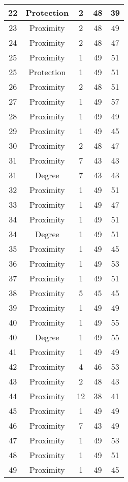 \documentclass[results.tex]{subfiles}
\begin{document}
\begin{center}
\begin{tabular}{| c || c | c | c | c |}
    \hline
    22 & Protection & 2 & 48 & 39 \\ 
    \hline
    23 & Proximity & 2 & 48 & 49 \\ 
    \hline
    24 & Proximity & 2 & 48 & 47 \\ 
    \hline
    25 & Proximity & 1 & 49 & 51 \\ 
    \hline
    25 & Protection & 1 & 49 & 51 \\ 
    \hline
    26 & Proximity & 2 & 48 & 51 \\ 
    \hline
    27 & Proximity & 1 & 49 & 57 \\ 
    \hline
    28 & Proximity & 1 & 49 & 49 \\ 
    \hline
    29 & Proximity & 1 & 49 & 45 \\ 
    \hline
    30 & Proximity & 2 & 48 & 47 \\ 
    \hline
    31 & Proximity & 7 & 43 & 43 \\ 
    \hline
    31 & Degree & 7 & 43 & 43 \\ 
    \hline
    32 & Proximity & 1 & 49 & 51 \\ 
    \hline
    33 & Proximity & 1 & 49 & 47 \\ 
    \hline
    34 & Proximity & 1 & 49 & 51 \\ 
    \hline
    34 & Degree & 1 & 49 & 51 \\ 
    \hline
    35 & Proximity & 1 & 49 & 45 \\ 
    \hline
    36 & Proximity & 1 & 49 & 53 \\ 
    \hline
    37 & Proximity & 1 & 49 & 51 \\ 
    \hline
    38 & Proximity & 5 & 45 & 45 \\ 
    \hline
    39 & Proximity & 1 & 49 & 49 \\ 
    \hline
    40 & Proximity & 1 & 49 & 55 \\ 
    \hline
    40 & Degree & 1 & 49 & 55 \\ 
    \hline
    41 & Proximity & 1 & 49 & 49 \\ 
    \hline
    42 & Proximity & 4 & 46 & 53 \\ 
    \hline
    43 & Proximity & 2 & 48 & 43 \\ 
    \hline
    44 & Proximity & 12 & 38 & 41 \\ 
    \hline
    45 & Proximity & 1 & 49 & 49 \\ 
    \hline
    46 & Proximity & 7 & 43 & 49 \\ 
    \hline
    47 & Proximity & 1 & 49 & 53 \\ 
    \hline
    48 & Proximity & 1 & 49 & 51 \\ 
    \hline
    49 & Proximity & 1 & 49 & 45 \\ 
    \hline   \end{tabular}
\end{center}
\end{document}

